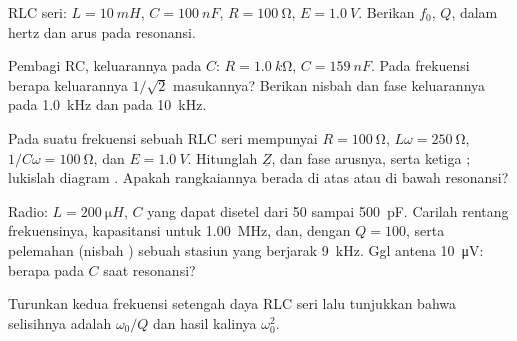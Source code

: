 \begin{exercise}[$\star$]\label{exo:b1:sinusoidal-impedance:4}
RLC seri: $L = \qty{10}{mH}$, $C = \qty{100}{nF}$, $R = \qty{100}{\ohm}$,
$E = \qty{1.0}{V}$. Berikan $f_0$, $Q$,  dalam hertz dan
 arus pada resonansi.
\end{exercise}

\begin{exercise}[$\star\star$]\label{exo:b1:sinusoidal-impedance:5}
Pembagi RC, keluarannya pada $C$: $R = \qty{1.0}{k\ohm}$, $C = \qty{159}{nF}$.
Pada frekuensi berapa keluarannya $1/\sqrt2$ masukannya? Berikan nisbah
 dan fase keluarannya pada \qty{1.0}{kHz} dan pada \qty{10}{kHz}.
\end{exercise}

\begin{exercise}[$\star\star$]\label{exo:b1:sinusoidal-impedance:6}
Pada suatu frekuensi sebuah RLC seri mempunyai $R = \qty{100}{\ohm}$, $L\omega =
\qty{250}{\ohm}$, $1/C\omega = \qty{100}{\ohm}$, dan $E = \qty{1.0}{V}$.
Hitunglah $\underline Z$,  dan fase arusnya, serta ketiga
 ; lukislah diagram . Apakah rangkaiannya
berada di atas atau di bawah resonansi?
\end{exercise}

\begin{exercise}[$\star\star$]\label{exo:b1:sinusoidal-impedance:7}
Radio: $L = \qty{200}{\micro H}$, $C$ yang dapat disetel dari \qty{50}{}
sampai \qty{500}{pF}. Carilah rentang frekuensinya, kapasitansi untuk
\qty{1.00}{MHz}, dan, dengan $Q = 100$,  serta pelemahan
(nisbah ) sebuah stasiun yang berjarak \qty{9}{kHz}. Ggl
antena \qty{10}{\micro V}: berapa  pada $C$ saat resonansi?
\end{exercise}

\begin{exercise}[$\star\star$]\label{exo:b1:sinusoidal-impedance:8}
Turunkan kedua frekuensi setengah daya RLC seri lalu tunjukkan bahwa
selisihnya adalah $\omega_0/Q$ dan hasil kalinya $\omega_0^2$.
\end{exercise}

